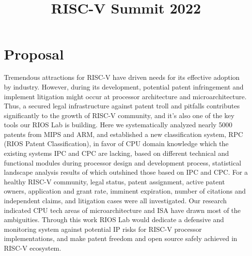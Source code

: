 \documentclass{article}
\title{RISC-V Summit 2022}
\begin{document}
\maketitle

\section{Proposal}

Tremendous attractions for RISC-V have driven needs for its effective adoption by industry. However, during its development, potential patent infringement and implement litigation might occur at processor architecture and microarchitecture. Thus, a secured legal infrastructure against patent troll and pitfalls contributes significantly to the growth of RISC-V community, and it’s also one of the key tools our RIOS Lab is building. Here we systematically analyzed nearly 5000 patents from MIPS and ARM, and established a new classification system, RPC (RIOS Patent Classification), in favor of CPU domain knowledge which the existing systems IPC and CPC are lacking, based on different technical and functional modules during processor design and development process, statistical landscape analysis results of which outshined those based on IPC and CPC. For a healthy RISC-V community, legal status, patent assignment, active patent owners, application and grant rate, imminent expiration, number of citations and independent claims, and litigation cases were all investigated. Our research indicated CPU tech areas of microarchitecture and ISA have drawn most of the ambiguities. Through this work RIOS Lab would dedicate a defensive and monitoring system against potential IP risks for RISC-V processor implementations, and make patent freedom and open source safely achieved in RISC-V ecosystem.
\end{document}
